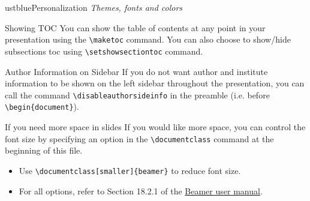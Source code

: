 \documentclass[]{beamer}
\newcommand{\hrefcol}[2]{\textcolor{uihteal}{\href{#1}{#2}}}
\begin{document}
\begin{chapter}{ustblue}{Personalization}
\textit{Themes, fonts and colors}
\end{chapter}

\begin{frame}[fragile]{Showing TOC}
You can show the table of contents at any point in your presentation using the \verb|\maketoc| command.
You can also choose to show/hide subsections toc using \verb|\setshowsectiontoc| command.
\end{frame}

\begin{frame}[fragile]{Author Information on Sidebar}
If you do not want author and institute information to be shown on the left sidebar throughout the presentation,
you can call the command \verb|\disableauthorsideinfo| in the preamble (i.e. before \verb|\begin{document}|).
\end{frame}

\begin{frame}[fragile]{If you need more space in slides}
If you would like more space, you can control the font size by specifying an option in the \verb|\documentclass| command at the beginning of this file.
\begin{itemize}
    \item Use \verb|\documentclass[smaller]{beamer}| to reduce font size.
    \item For all options, refer to Section 18.2.1 of the \hrefcol{https://www.ctan.org/tex-archive/macros/latex/contrib/beamer/doc/beameruserguide.pdf}{Beamer user manual}.
\end{itemize}
\end{frame}
\end{document}
